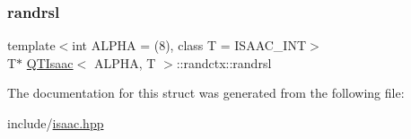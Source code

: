 \mbox{\label{structQTIsaac_1_1randctx_ab0fb9debfb0c947147b1b4f8e17af4e6}} 
\subsubsection{\texorpdfstring{randrsl}{randrsl}}
{\footnotesize\ttfamily template$<$int A\+L\+P\+HA = (8), class T = I\+S\+A\+A\+C\+\_\+\+I\+NT$>$ \\
T$\ast$ \hyperlink{classQTIsaac}{Q\+T\+Isaac}$<$ A\+L\+P\+HA, T $>$\+::randctx\+::randrsl}



The documentation for this struct was generated from the following file\+:\begin{DoxyCompactItemize}
\item 
include/\hyperlink{isaac_8hpp}{isaac.\+hpp}\end{DoxyCompactItemize}
